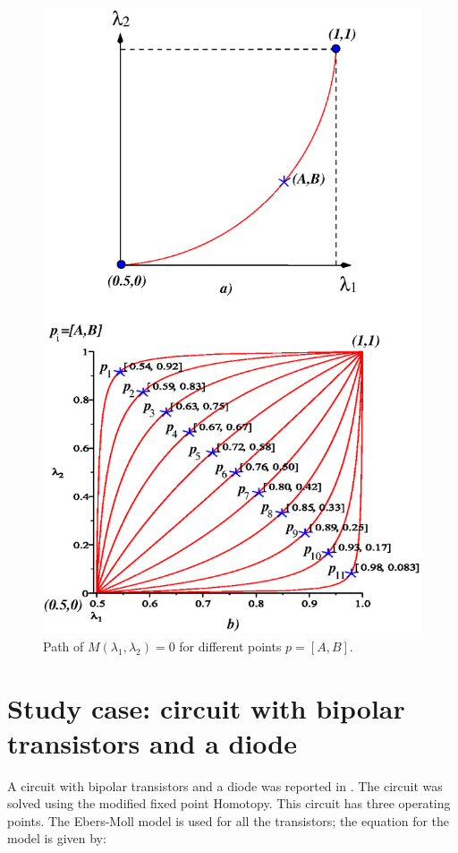 \documentclass[conference,letterpaper,twocolumn]{IEEEtran}
\begin{document}
\begin{figure}[hbtp]
\centering
\includegraphics[scale=0.6]{fig/curvasl.eps}
\caption{Path of $M(\lambda_1,\lambda_2)=0$ for different points $p=[A,B]$.}
\label{curvasl}
\end{figure}

\section{Study case: circuit with bipolar transistors and a diode}

A circuit with bipolar transistors and a diode was reported in \cite{homo_yamamura}. The circuit was solved using the modified fixed point Homotopy. This circuit has three operating points. The Ebers-Moll model is used for all the transistors; the equation for the model is given by:
\end{document}
